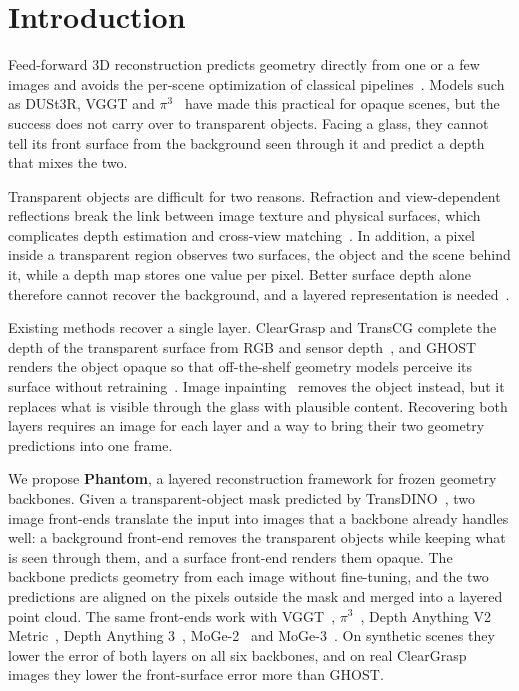\section{Introduction}
\label{sec:intro}

Feed-forward 3D reconstruction predicts geometry directly from one or a few images and avoids the per-scene optimization of classical pipelines~\cite{colmap,mvs}.
Models such as DUSt3R, VGGT and $\pi^3$~\cite{dust3r,vggt,pi3} have made this practical for opaque scenes, but the success does not carry over to transparent objects.
Facing a glass, they cannot tell its front surface from the background seen through it and predict a depth that mixes the two.

Transparent objects are difficult for two reasons.
Refraction and view-dependent reflections break the link between image texture and physical surfaces, which complicates depth estimation and cross-view matching~\cite{cleargrasp,lookingglass,neto}.
In addition, a pixel inside a transparent region observes two surfaces, the object and the scene behind it, while a depth map stores one value per pixel.
Better surface depth alone therefore cannot recover the background, and a layered representation is needed~\cite{ldi,photo3d}.

Existing methods recover a single layer.
ClearGrasp and TransCG complete the depth of the transparent surface from RGB and sensor depth~\cite{cleargrasp,transcg}, and GHOST renders the object opaque so that off-the-shelf geometry models perceive its surface without retraining~\cite{ghost}.
Image inpainting~\cite{partialconv,lama,mat} removes the object instead, but it replaces what is visible through the glass with plausible content.
Recovering both layers requires an image for each layer and a way to bring their two geometry predictions into one frame.

We propose \textbf{Phantom}, a layered reconstruction framework for frozen geometry backbones.
Given a transparent-object mask predicted by TransDINO~\cite{ghost}, two image front-ends translate the input into images that a backbone already handles well: a background front-end removes the transparent objects while keeping what is seen through them, and a surface front-end renders them opaque.
The backbone predicts geometry from each image without fine-tuning, and the two predictions are aligned on the pixels outside the mask and merged into a layered point cloud.
The same front-ends work with VGGT~\cite{vggt}, $\pi^3$~\cite{pi3}, Depth Anything V2 Metric~\cite{dav2}, Depth Anything 3~\cite{da3}, MoGe-2~\cite{moge2} and MoGe-3~\cite{moge3}.
On synthetic scenes they lower the error of both layers on all six backbones, and on real ClearGrasp images they lower the front-surface error more than GHOST.

